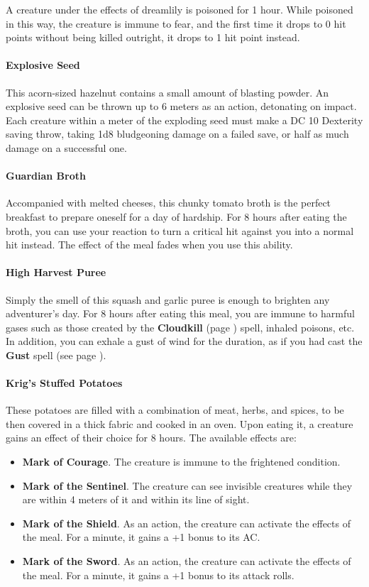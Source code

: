         A creature under the effects of dreamlily is poisoned for 1 hour.
        While poisoned in this way, the creature is immune to fear, and the first time it drops to 0 hit points without being killed outright, it drops to 1 hit point instead.
    \paragraph{Explosive Seed}
        This acorn-sized hazelnut contains a small amount of blasting powder.
        An explosive seed can be thrown up to 6 meters as an action, detonating on impact.
        Each creature within a meter of the exploding seed must make a DC 10 Dexterity saving throw, taking 1d8 bludgeoning damage on a failed save, or half as much damage on a successful one.
    \paragraph{Guardian Broth}
        Accompanied with melted cheeses, this chunky tomato broth is the perfect breakfast to prepare oneself for a day of hardship.
        For 8 hours after eating the broth, you can use your reaction to turn a critical hit against you into a normal hit instead.
		The effect of the meal fades when you use this ability.
    \paragraph{High Harvest Puree}
        Simply the smell of this squash and garlic puree is enough to brighten any adventurer's day.
        For 8 hours after eating this meal, you are immune to harmful gases such as those created by the \textbf{Cloudkill} (page \pageref{spell::cloudkill}) spell, inhaled poisons, etc.
        In addition, you can exhale a gust of wind for the duration, as if you had cast the \textbf{Gust} spell (see page \pageref{spell::gust}).
    \paragraph{Krig's Stuffed Potatoes}
        These potatoes are filled with a combination of meat, herbs, and spices, to be then covered in a thick fabric and cooked in an oven.
        Upon eating it, a creature gains an effect of their choice for 8 hours.
        The available effects are:
        \begin{itemize}
            \item \textbf{Mark of Courage}.
                The creature is immune to the frightened condition.
            \item \textbf{Mark of the Sentinel}.
                The creature can see invisible creatures while they are within 4 meters of it and within its line of sight.
            \item \textbf{Mark of the Shield}.
                As an action, the creature can activate the effects of the meal.
                For a minute, it gains a +1 bonus to its AC.
            \item \textbf{Mark of the Sword}.
                As an action, the creature can activate the effects of the meal.
                For a minute, it gains a +1 bonus to its attack rolls.
        \end{itemize}
